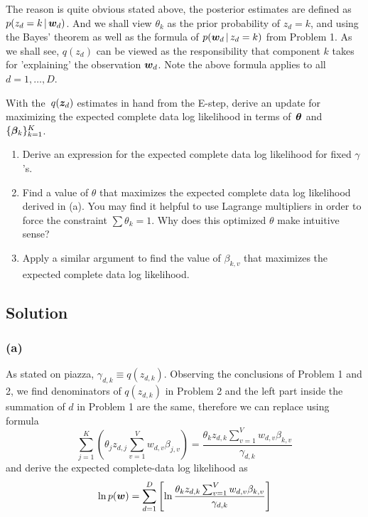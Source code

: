 \documentclass[submit]{harvardml}
\begin{document}
The reason is quite obvious stated above, the posterior estimates are defined as $p(z_d=k \,|\, \boldsymbol{w}_d)$. And we shall view $\theta_k$ as the prior probability of $z_d=k$, and using the Bayes' theorem as well as the formula of $p(\boldsymbol{w}_d\,|\, z_d=k)$ from Problem 1. As we shall see, $q(z_d)$ can be viewed as the responsibility that component $k$ takes for 'explaining' the observation $\boldsymbol{w}_d$. Note the above formula applies to all $d = 1,\dots, D$.

\newpage

\begin{problem}
With the~$q(\boldsymbol{z}_d)$ estimates in hand from the E-step, derive an update for maximizing the expected complete data log likelihood in terms of~$\boldsymbol{\theta}$ and~$\{\boldsymbol{\beta}_k\}^K_{k=1}$.

\begin{enumerate}[label=(\alph*)]
    \item Derive an expression for the expected complete data log likelihood for fixed $\gamma$'s. 
    \item Find a value of $\theta$ that maximizes the expected complete data log likelihood derived in (a). You may find it helpful to use Lagrange multipliers in order to force the constraint $\sum \theta_k = 1$. Why does this optimized $\theta$ make intuitive sense?
    \item Apply a similar argument to find the value of $\beta_{k, v}$ that maximizes the expected complete data log likelihood. 
\end{enumerate}

\end{problem}
\subsection*{Solution}

\subsubsection*{(a)}

As stated on piazza, $\gamma_{d,k} \equiv q(z_{d,k})$. Observing the conclusions of Problem 1 and 2, we find denominators of $q(z_{d,k})$ in Problem 2 and the left part inside the summation of $d$ in Problem 1 are the same, therefore we can replace using formula
$$ \sum_{j=1}^K{\left( \theta_j z_{d,j} \sum_{v=1}^V{w_{d,v}\beta_{j,v}} \right)} = \frac{\theta_k z_{d,k} \sum_{v=1}^V{w_{d,v}\beta_{k,v}}}{\gamma_{d,k}} $$
and derive the expected complete-data log likelihood as 
$$ \ln p(\boldsymbol{w}) = \sum_{d=1}^D \left[ \ln \frac{\theta_k z_{d,k} \sum_{v=1}^V{w_{d,v}\beta_{k,v}}}{\gamma_{d,k}} \right]$$
\end{document}
